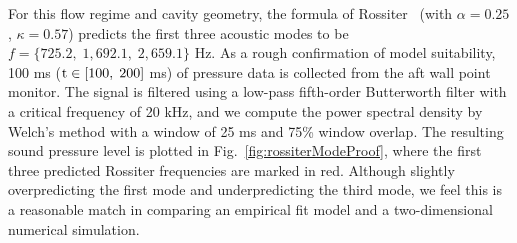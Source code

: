 For this flow regime and cavity geometry, the formula of Rossiter~\cite{Rossiter1964} (with $\alpha = 0.25$, $\kappa = 0.57$) predicts the first three acoustic modes to be $f = \{725.2, \; 1,692.1, \; 2,659.1\}$ Hz. As a rough confirmation of model suitability, 100 ms ($\text{t} \in [100, \; 200]$ ms) of pressure data is collected from the aft wall point monitor. The signal is filtered using a low-pass fifth-order Butterworth filter with a critical frequency of 20 kHz, and we compute the power spectral density by Welch's method with a window of 25 ms and 75\% window overlap. The resulting sound pressure level is plotted in Fig.~\ref{fig:rossiterModeProof}, where the first three predicted Rossiter frequencies are marked in red. Although slightly overpredicting the first mode and underpredicting the third mode, we feel this is a reasonable match in comparing an empirical fit model and a two-dimensional numerical simulation.

